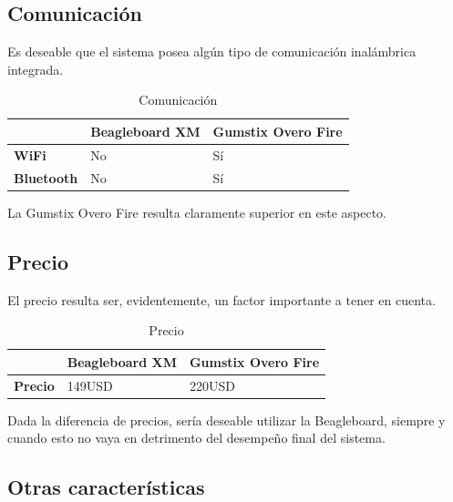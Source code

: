 \documentclass[main]{subfiles}
\begin{document}
\subsection*{Comunicaci\'on}

Es deseable que el sistema posea alg\'un tipo de comunicaci\'on inal\'ambrica integrada.

\begin{table}[H]
\begin{tabular}{p{130pt}|p{130pt}|p{130pt}|} 
\cline{2-3}
& \cellcolor[gray]{0.8} \textbf{Beagleboard XM} 
& \cellcolor[gray]{0.8} \textbf{Gumstix Overo Fire} \\ \cline{1-3} \hline
\multicolumn{1}{|p{130pt}|}{\cellcolor[gray]{0.8}\textbf{WiFi}} 
&No &S\'i\\ 
\hline 
\multicolumn{1}{|p{130pt}|}{\cellcolor[gray]{0.8}\textbf{Bluetooth}} 
&No &S\'i\\
\hline
\end{tabular}
\caption{Comunicaci\'on}
\label{tab:comunicacion}
\end{table}

La Gumstix Overo Fire resulta claramente superior en este aspecto.

\subsection*{Precio}

El precio resulta ser, evidentemente, un factor importante a tener en cuenta.

\begin{table}[H]
\begin{tabular}{p{130pt}|p{130pt}|p{130pt}|} 
\cline{2-3}
& \cellcolor[gray]{0.8} \textbf{Beagleboard XM} 
& \cellcolor[gray]{0.8} \textbf{Gumstix Overo Fire} \\ \cline{1-3} \hline
\multicolumn{1}{|p{130pt}|}{\cellcolor[gray]{0.8}\textbf{Precio}} 
&149USD &220USD\\
\hline 
\end{tabular}
\caption{Precio}
\label{tab:precio}
\end{table}

Dada la diferencia de precios, ser\'ia deseable utilizar la Beagleboard, siempre y cuando esto no vaya en detrimento del desempe\~no final del sistema.

\subsection*{Otras caracter\'isticas}
\end{document}
